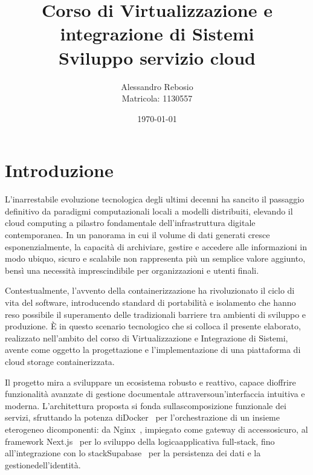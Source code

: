 \documentclass[12pt,a4paper]{report}
\begin{document}
\title{
  Corso di Virtualizzazione e integrazione di Sistemi
  \\ Sviluppo servizio cloud
}
\author{
  Alessandro Rebosio \\
  Matricola: 1130557
}
\date{\today}

\maketitle


\chapter*{Introduzione}
\label{chap:introduzione}
L'inarrestabile evoluzione tecnologica degli ultimi decenni ha
sancito il passaggio definitivo da paradigmi computazionali locali a
modelli distribuiti, elevando il cloud computing a pilastro
fondamentale dell'infrastruttura digitale contemporanea. In un
panorama in cui il volume di dati generati cresce esponenzialmente,
la capacità di archiviare, gestire e accedere alle informazioni in
modo ubiquo, sicuro e scalabile non rappresenta più un semplice
valore aggiunto, bensì una necessità imprescindibile per
organizzazioni e utenti finali.

Contestualmente, l'avvento della containerizzazione ha rivoluzionato
il ciclo di vita del software, introducendo standard di portabilità e
isolamento che hanno reso possibile il superamento delle tradizionali
barriere tra ambienti di sviluppo e produzione. È in questo scenario
tecnologico che si colloca il presente elaborato, realizzato
nell'ambito del corso di Virtualizzazione e Integrazione di Sistemi,
avente come oggetto la progettazione e l'implementazione di una
piattaforma di cloud storage containerizzata.

Il progetto mira a sviluppare un ecosistema robusto e reattivo,
capace dioffrire funzionalità avanzate di gestione documentale
attraversoun'interfaccia intuitiva e moderna. L'architettura proposta
si fonda sullascomposizione funzionale dei servizi, sfruttando la
potenza diDocker~\cite{docker} per l'orchestrazione di un insieme
eterogeneo dicomponenti: da Nginx~\cite{nginx}, impiegato come
gateway di accessosicuro, al framework Next.js~\cite{nextjs} per lo
sviluppo della logicaapplicativa full-stack, fino all'integrazione
con lo stackSupabase~\cite{supabase} per la persistenza dei dati e la
gestionedell'identità.
\end{document}
